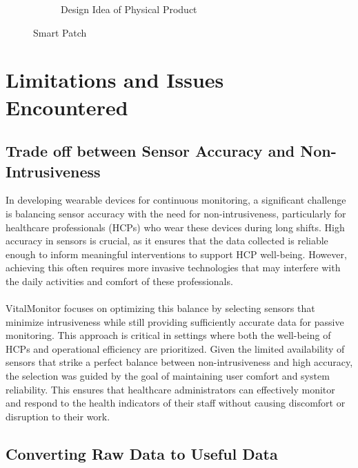 \begin{figure}[h!]
\begin{subfigure}[b]{0.45\linewidth}
        \caption{Design Idea of Physical Product}
        \label{fig:fig-design}
    \end{subfigure}
    \caption{Smart Patch}
    \label{fig:fig-smartpatch}
\end{figure}

\section{Limitations and Issues Encountered}

\subsection{Trade off between Sensor Accuracy and Non-Intrusiveness}
In developing wearable devices for continuous monitoring, a significant challenge is balancing sensor accuracy with the need for non-intrusiveness, particularly for healthcare professionals (HCPs) who wear these devices during long shifts. High accuracy in sensors is crucial, as it ensures that the data collected is reliable enough to inform meaningful interventions to support HCP well-being. However, achieving this often requires more invasive technologies that may interfere with the daily activities and comfort of these professionals.\\ \\
VitalMonitor focuses on optimizing this balance by selecting sensors that minimize intrusiveness while still providing sufficiently accurate data for passive monitoring. This approach is critical in settings where both the well-being of HCPs and operational efficiency are prioritized. Given the limited availability of sensors that strike a perfect balance between non-intrusiveness and high accuracy, the selection was guided by the goal of maintaining user comfort and system reliability. This ensures that healthcare administrators can effectively monitor and respond to the health indicators of their staff without causing discomfort or disruption to their work.


\subsection{Converting Raw Data to Useful Data}

